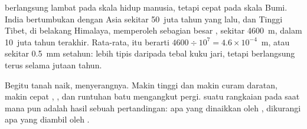  berlangsung lambat pada skala hidup manusia, tetapi cepat
pada skala Bumi. India bertumbukan dengan Asia sekitar 50~juta tahun yang
lalu, dan  Tinggi Tibet, di belakang Himalaya, memperoleh sebagian
besar , sekitar \qty{4600}{m}, dalam 10~juta tahun terakhir.
Rata-rata, itu berarti
$4600 \div 10^7 = 4.6 \times 10^{-4}$~m, atau sekitar \qty{0.5}{mm}
setahun: lebih tipis daripada tebal kuku jari, tetapi berlangsung terus
selama jutaan tahun.

Begitu tanah naik,  menyerangnya. Makin tinggi dan makin curam
daratan, makin cepat , , dan runtuhan batu mengangkut 
pergi.  suatu rangkaian  pada saat mana pun adalah
hasil sebuah pertandingan: apa yang dinaikkan oleh , dikurangi
apa yang diambil oleh .

